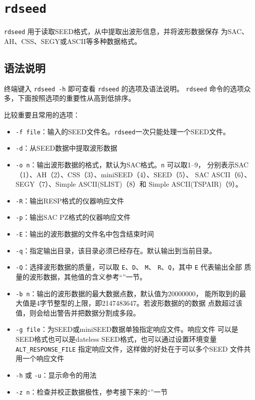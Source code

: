 \section{\texttt{rdseed}}
\label{sec:rdseed}

\texttt{rdseed} 用于读取SEED格式，从中提取出波形信息，并将波形数据保存
为SAC、AH、CSS、SEGY或ASCII等多种数据格式。

\subsection{语法说明}
终端键入 \texttt{rdseed -h} 即可查看 \texttt{rdseed} 的选项及语法说明。
\texttt{rdseed} 命令的选项众多，下面按照选项的重要性从高到低排序。

比较重要且常用的选项：
\begin{itemize}
\item \texttt{-f file}：输入的SEED文件名。\texttt{rdseed}一次只能处理一个SEED文件。
\item \texttt{-d}：从SEED数据中提取波形数据
\item \texttt{-o n}：输出波形数据的格式，默认为SAC格式。\texttt{n} 可以取1--9，
    分别表示SAC（1）、AH（2）、CSS（3）、miniSEED（4）、SEED（5）、
    SAC ASCII（6）、SEGY（7）、Simple ASCII(SLIST)（8）和
    Simple ASCII(TSPAIR)（9）。
\item \texttt{-R}：输出RESP格式的仪器响应文件
\item \texttt{-p}：输出SAC PZ格式的仪器响应文件
\item \texttt{-E}：输出的波形数据的文件名中包含结束时间
\item \texttt{-q}：指定输出目录，该目录必须已经存在。默认输出到当前目录。
\item \texttt{-Q}：选择波形数据的质量，可以取 \texttt{E}、\texttt{D}、
    \texttt{M}、 \texttt{R}、\texttt{Q}，其中 \texttt{E} 代表输出全部
    质量的波形数据，其他值的含义参考``''一节。
\item \texttt{-b n}：输出的波形数据的最大数据点数，默认值为20000000，
    能所取到的最大值是4字节整型的上限，即2147483647。若波形数据的的数据
    点数超过该值，则会给出警告并把数据分割成多段。
\item \texttt{-g file}：为SEED或miniSEED数据单独指定响应文件。响应文件
    可以是SEED格式也可以是dateless SEED格式，也可以通过设置环境变量
    \verb|ALT_RESPONSE_FILE| 指定响应文件，这样做的好处在于可以多个SEED
    文件共用一个响应文件
\item \texttt{-h} 或 \texttt{-u}：显示命令的用法
\item \texttt{-z n}：检查并校正数据极性，参考接下来的``''一节
\end{itemize}

